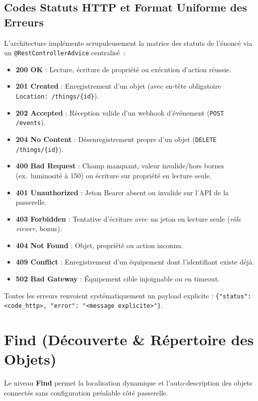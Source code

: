 \documentclass[10pt,a4paper]{article}
\begin{document}
\subsection{Codes Statuts HTTP et Format Uniforme des Erreurs}
L'architecture implémente scrupuleusement la matrice des statuts de l'énoncé via un \texttt{@RestControllerAdvice} centralisé~:
\begin{itemize}
  \item \textbf{200 OK} : Lecture, écriture de propriété ou exécution d'action réussie.
  \item \textbf{201 Created} : Enregistrement d'un objet (avec en-tête obligatoire \texttt{Location: /things/\{id\}}).
  \item \textbf{202 Accepted} : Réception valide d'un webhook d'événement (\texttt{POST /events}).
  \item \textbf{204 No Content} : Désenregistrement propre d'un objet (\texttt{DELETE /things/\{id\}}).
  \item \textbf{400 Bad Request} : Champ manquant, valeur invalide/hors bornes (ex.~luminosité à 150) ou écriture sur propriété en lecture seule.
  \item \textbf{401 Unauthorized} : Jeton Bearer absent ou invalide sur l'API de la passerelle.
  \item \textbf{403 Forbidden} : Tentative d'écriture avec un jeton en lecture seule (\emph{rôle viewer}, bonus).
  \item \textbf{404 Not Found} : Objet, propriété ou action inconnu.
  \item \textbf{409 Conflict} : Enregistrement d'un équipement dont l'identifiant existe déjà.
  \item \textbf{502 Bad Gateway} : Équipement cible injoignable ou en timeout.
\end{itemize}
Toutes les erreurs renvoient systématiquement un payload explicite : \texttt{\{"status": <code\_http>, "error": "<message explicite>"\}}.

\section{Find (Découverte \& Répertoire des Objets)}
Le niveau \textbf{Find} permet la localisation dynamique et l'auto-description des objets connectés sans configuration préalable côté passerelle.
\end{document}
